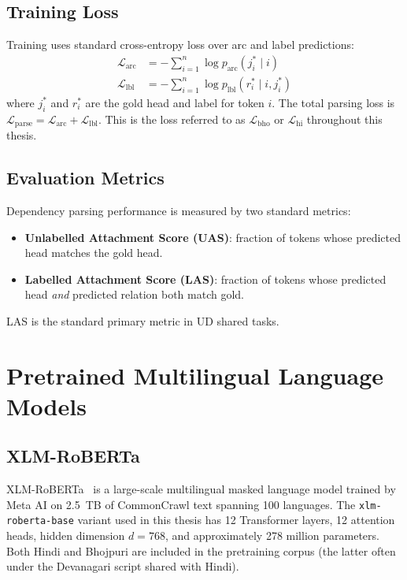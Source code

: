 \documentclass[12pt,a4paper,oneside]{report}
\newcommand{\bho}{Bhojpuri}
\newcommand{\hi}{Hindi}
\newcommand{\xlmr}{XLM-RoBERTa}
\begin{document}
\subsection{Training Loss}

Training uses standard cross-entropy loss over arc and label predictions:
\begin{align}
  \mathcal{L}_{\text{arc}} &= -\sum_{i=1}^{n} \log p_{\text{arc}}(j^*_i \mid i) \\
  \mathcal{L}_{\text{lbl}} &= -\sum_{i=1}^{n} \log p_{\text{lbl}}(r^*_i \mid i, j^*_i)
\end{align}
where $j^*_i$ and $r^*_i$ are the gold head and label for token $i$. The total
parsing loss is $\mathcal{L}_{\text{parse}} = \mathcal{L}_{\text{arc}} +
\mathcal{L}_{\text{lbl}}$. This is the loss referred to as
$\mathcal{L}_{\text{bho}}$ or $\mathcal{L}_{\text{hi}}$ throughout this thesis.

\subsection{Evaluation Metrics}

Dependency parsing performance is measured by two standard metrics:
\begin{itemize}
  \item \textbf{Unlabelled Attachment Score (UAS)}: fraction of tokens whose
        predicted head matches the gold head.
  \item \textbf{Labelled Attachment Score (LAS)}: fraction of tokens whose
        predicted head \emph{and} predicted relation both match gold.
\end{itemize}
LAS is the standard primary metric in UD shared tasks.

\section{Pretrained Multilingual Language Models}

\subsection{XLM-RoBERTa}
\label{sec:xlmr}

\xlmr{}~\citep{conneau2020xlmr} is a large-scale multilingual masked language model
trained by Meta AI on 2.5~TB of CommonCrawl text spanning 100 languages. The
\texttt{xlm-roberta-base} variant used in this thesis has 12 Transformer layers,
12 attention heads, hidden dimension $d = 768$, and approximately 278 million
parameters. Both \hi{} and \bho{} are included in the pretraining corpus (the latter
often under the Devanagari script shared with \hi{}).
\end{document}
